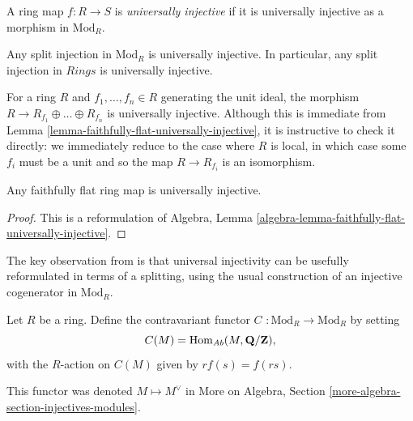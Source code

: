 \begin{definition}
\label{definition-universally-injective}
A ring map $f: R \to S$ is {\it universally injective}
if it is universally injective as a morphism in $\text{Mod}_R$.
\end{definition}

\begin{example}
\label{example-split-injection-universally-injective}
Any split injection in $\text{Mod}_R$ is universally injective. In particular,
any split injection in $\textit{Rings}$ is universally injective.
\end{example}

\begin{example}
\label{example-cover-universally-injective}
For a ring $R$ and $f_1, \ldots, f_n \in R$ generating the unit
ideal, the morphism $R \to R_{f_1} \oplus \ldots \oplus R_{f_n}$ is
universally injective. Although this is immediate from
Lemma \ref{lemma-faithfully-flat-universally-injective},
it is instructive to check it directly: we immediately reduce to the case
where $R$ is local, in which case some $f_i$ must be a unit and so the map
$R \to R_{f_i}$ is an isomorphism.
\end{example}

\begin{lemma}
\label{lemma-faithfully-flat-universally-injective}
Any faithfully flat ring map is universally injective.
\end{lemma}

\begin{proof}
This is a reformulation of Algebra, Lemma
\ref{algebra-lemma-faithfully-flat-universally-injective}.
\end{proof}

\noindent
The key observation from \cite{mesablishvili1} is that universal injectivity 
can be usefully reformulated in terms of a splitting, using the usual
construction of an injective cogenerator in $\text{Mod}_R$.

\begin{definition}
\label{definition-C}
Let $R$ be a ring. Define the contravariant functor
{\it $C$} $ : \text{Mod}_R \to \text{Mod}_R$ by setting
$$
C(M) = \mathop{\mathrm{Hom}}\nolimits_{\textit{Ab}}(M, \mathbf{Q}/\mathbf{Z}),
$$
with the $R$-action on $C(M)$ given by $rf(s) = f(rs)$.
\end{definition}

\noindent
This functor was denoted $M \mapsto M^\vee$ in
More on Algebra, Section \ref{more-algebra-section-injectives-modules}.

